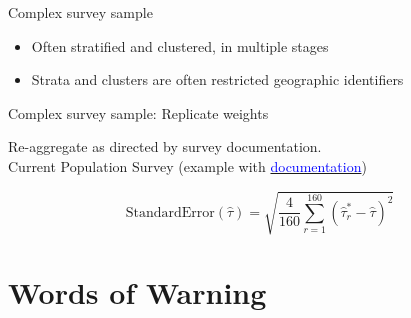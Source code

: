 \documentclass{beamer}
\begin{document}
\begin{frame}{Complex survey sample}

\begin{itemize}
\item Often stratified and clustered, in multiple stages
\item Strata and clusters are often restricted geographic identifiers
\end{itemize}

\end{frame}


\begin{frame}{Complex survey sample: Replicate weights}

Re-aggregate as directed by survey documentation.\\
Current Population Survey (example with \href{https://cps.ipums.org/cps/repwt.shtml}{\textcolor{blue}{documentation}}) \pause

$$\text{StandardError}(\hat\tau) = \sqrt{\frac{4}{160}\sum_{r=1}^{160}\left(\hat\tau^*_r - \hat\tau\right)^2}$$

\end{frame}

\section{Words of Warning}
\end{document}
